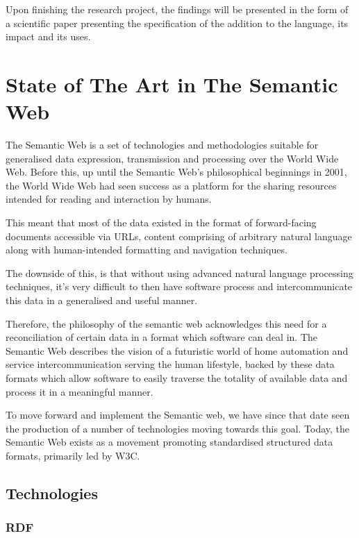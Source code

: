 \documentclass{article}
\begin{document}
Upon finishing the research project, the findings will be presented in the form
of a scientific paper presenting the specification of the addition to the
language, its impact and its uses.

\section{State of The Art in The Semantic Web}

The Semantic Web is a set of technologies and methodologies suitable for
generalised data expression, transmission and processing over the World Wide
Web. Before this, up until the Semantic Web's philosophical beginnings in
2001, the World Wide Web had seen success as a platform for the
sharing resources intended for reading and interaction by humans.

This meant that most of the data existed in the format of forward-facing 
documents accessible via URLs, content comprising of arbitrary natural language
along with human-intended formatting and navigation techniques.

The downside of this, is that without using advanced natural language 
processing techniques, it's very difficult to then have software process and
intercommunicate this data in a generalised and useful manner.

Therefore, the philosophy of the semantic web acknowledges this need for a
reconciliation of certain data in a format which software can deal in. The
Semantic Web\cite{semweb} describes the vision of a futuristic world of home
automation and service intercommunication serving the human lifestyle, backed by
these data formats which allow software to easily traverse the totality of
available data and process it in a meaningful manner. 

To move forward and implement the Semantic web, we have since that date seen the
production of a number of technologies moving towards this goal. Today, the
Semantic Web exists as a movement promoting standardised structured data
formats, primarily led by W3C.

\subsection{Technologies}

\subsubsection{RDF}
\end{document}
